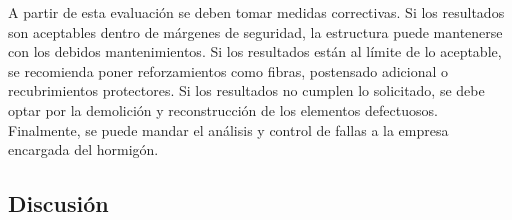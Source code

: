 A partir de esta evaluación se deben tomar medidas correctivas. Si los resultados son aceptables dentro de márgenes de seguridad, la estructura puede mantenerse con los debidos mantenimientos. Si los resultados están al límite de lo aceptable, se recomienda poner reforzamientos como fibras, postensado adicional o recubrimientos protectores. Si los resultados no cumplen lo solicitado, se debe optar por la demolición y reconstrucción de los elementos defectuosos. Finalmente, se puede mandar el análisis y control de fallas a la empresa encargada del hormigón.



\subsection{Discusión}

